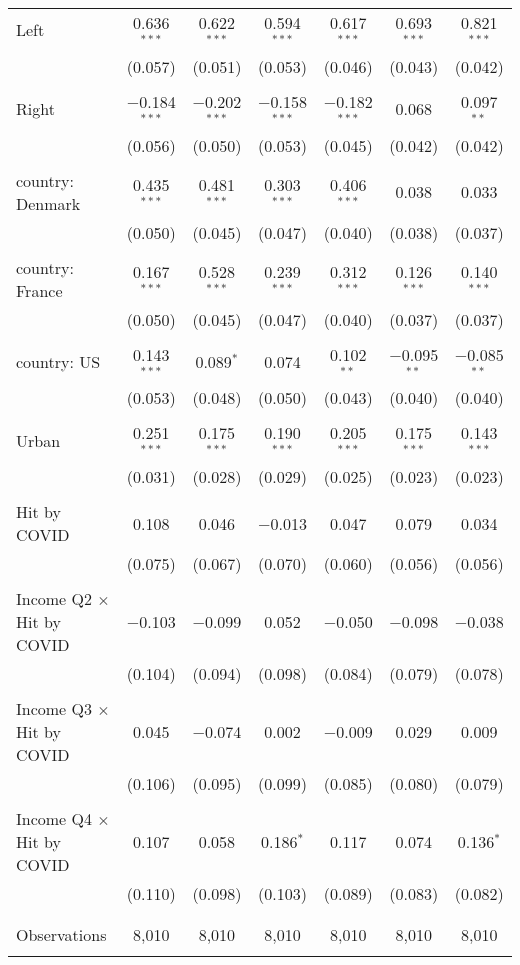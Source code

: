 \begin{tabular}{@{\extracolsep{5pt}}lcccccc}
 Left & 0.636$^{***}$ & 0.622$^{***}$ & 0.594$^{***}$ & 0.617$^{***}$ & 0.693$^{***}$ & 0.821$^{***}$ \\ 
  & (0.057) & (0.051) & (0.053) & (0.046) & (0.043) & (0.042) \\ 
  & & & & & & \\ 
 Right & $-$0.184$^{***}$ & $-$0.202$^{***}$ & $-$0.158$^{***}$ & $-$0.182$^{***}$ & 0.068 & 0.097$^{**}$ \\ 
  & (0.056) & (0.050) & (0.053) & (0.045) & (0.042) & (0.042) \\ 
  & & & & & & \\ 
 country: Denmark & 0.435$^{***}$ & 0.481$^{***}$ & 0.303$^{***}$ & 0.406$^{***}$ & 0.038 & 0.033 \\ 
  & (0.050) & (0.045) & (0.047) & (0.040) & (0.038) & (0.037) \\ 
  & & & & & & \\ 
 country: France & 0.167$^{***}$ & 0.528$^{***}$ & 0.239$^{***}$ & 0.312$^{***}$ & 0.126$^{***}$ & 0.140$^{***}$ \\ 
  & (0.050) & (0.045) & (0.047) & (0.040) & (0.037) & (0.037) \\ 
  & & & & & & \\ 
 country: US & 0.143$^{***}$ & 0.089$^{*}$ & 0.074 & 0.102$^{**}$ & $-$0.095$^{**}$ & $-$0.085$^{**}$ \\ 
  & (0.053) & (0.048) & (0.050) & (0.043) & (0.040) & (0.040) \\ 
  & & & & & & \\ 
 Urban & 0.251$^{***}$ & 0.175$^{***}$ & 0.190$^{***}$ & 0.205$^{***}$ & 0.175$^{***}$ & 0.143$^{***}$ \\ 
  & (0.031) & (0.028) & (0.029) & (0.025) & (0.023) & (0.023) \\ 
  & & & & & & \\ 
 Hit by COVID & 0.108 & 0.046 & $-$0.013 & 0.047 & 0.079 & 0.034 \\ 
  & (0.075) & (0.067) & (0.070) & (0.060) & (0.056) & (0.056) \\ 
  & & & & & & \\ 
 Income Q2 $\times$ Hit by COVID & $-$0.103 & $-$0.099 & 0.052 & $-$0.050 & $-$0.098 & $-$0.038 \\ 
  & (0.104) & (0.094) & (0.098) & (0.084) & (0.079) & (0.078) \\ 
  & & & & & & \\ 
 Income Q3 $\times$ Hit by COVID & 0.045 & $-$0.074 & 0.002 & $-$0.009 & 0.029 & 0.009 \\ 
  & (0.106) & (0.095) & (0.099) & (0.085) & (0.080) & (0.079) \\ 
  & & & & & & \\ 
 Income Q4 $\times$ Hit by COVID & 0.107 & 0.058 & 0.186$^{*}$ & 0.117 & 0.074 & 0.136$^{*}$ \\ 
  & (0.110) & (0.098) & (0.103) & (0.089) & (0.083) & (0.082) \\ 
  & & & & & & \\ 
\hline \\[-1.8ex] 

Observations & 8,010 & 8,010 & 8,010 & 8,010 & 8,010 & 8,010 \\ 
\hline 
\hline \\[-1.8ex] 
\end{tabular} 